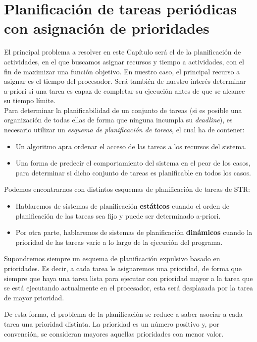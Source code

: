 \section{Planificación de tareas periódicas con asignación de prioridades}
El principal problema a resolver en este Capítulo será el de la planificación de actividades, en el que buscamos asignar recursos y tiempo a actividades, con el fin de maximizar una función objetivo. En nuestro caso, el principal recurso a asignar es el tiempo del procesador. Será también de nuestro interés determinar a-priori si una tarea es capaz de completar su ejecución antes de que se alcance su tiempo límite.\\

Para determinar la planificabilidad de un conjunto de tareas (si es posible una organización de todas ellas de forma que ninguna incumpla su \textit{deadline}), es necesario utilizar un \textit{esquema de planificación de tareas}, el cual ha de contener:
\begin{itemize}
    \item Un algoritmo apra ordenar el acceso de las tareas a los recursos del sistema.
    \item Una forma de predecir el comportamiento del sistema en el peor de los casos, para determinar si dicho conjunto de tareas es planificable en todos los casos.
\end{itemize}
Podemos encontrarnos con distintos esquemas de planificación de tareas de STR\@:
\begin{itemize}
    \item Hablaremos de sistemas de planificación \textbf{estáticos} cuando el orden de planificación de las tareas sea fijo y puede ser determinado a-priori.
    \item Por otra parte, hablaremos de sistemas de planificación \textbf{dinámicos} cuando la prioridad de las tareas varíe a lo largo de la ejecución del programa.
\end{itemize}
Supondremos siempre un esquema de planificación expulsivo basado en prioridades. Es decir, a cada tarea le asignaremos una prioridad, de forma que siempre que haya una tarea lista para ejecutar con prioridad mayor a la tarea que se está ejecutando actualmente en el procesador, esta será desplazada por la tarea de mayor prioridad.

De esta forma, el problema de la planificación se reduce a saber asociar a cada tarea una prioridad distinta. La prioridad es un número positivo y, por convención, se consideran mayores aquellas prioridades con menor valor.


